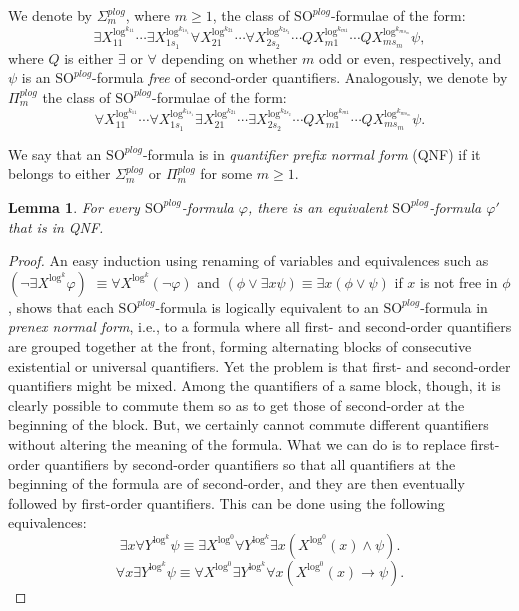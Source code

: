 \documentclass{article}
\newtheorem{lemma}{Lemma}
\begin{document}
We denote by $\Sigma^{\mathit{plog}}_m$, where $m \geq 1$, the class of $\mathrm{SO}^{\mathit{plog}}$-formulae of the form:
\[\exists X^{\log^{k_{11}}}_{11} \cdots \exists X^{\log^{k_{1s_1}}}_{1s_1} \forall X^{\log^{k_{21}}}_{21} \cdots \forall X^{\log^{k_{2s_2}}}_{2s_2} \cdots Q X^{\log^{k_{m1}}}_{m1} \cdots Q X^{\log^{k_{ms_m}}}_{ms_m} \psi,\]
where $Q$ is either $\exists$ or $\forall$ depending on whether $m$ odd or even, respectively, and $\psi$ is an $\mathrm{SO}^{\mathit{plog}}$-formula \emph{free} of second-order quantifiers.  
Analogously, we denote by $\Pi^{\mathit{plog}}_m$ the class of $\mathrm{SO}^{\mathit{plog}}$-formulae of the form:
\[\forall X^{\log^{k_{11}}}_{11} \cdots \forall X^{\log^{k_{1s_1}}}_{1s_1} \exists X^{\log^{k_{21}}}_{21} \cdots \exists X^{\log^{k_{2s_2}}}_{2s_2} \cdots Q X^{\log^{k_{m1}}}_{m1} \cdots Q X^{\log^{k_{ms_m}}}_{ms_m} \psi.\]

We say that an $\mathrm{SO}^{\mathit{plog}}$-formula is in \emph{quantifier prefix normal form} (QNF) if it belongs to either $\Sigma^{\mathit{plog}}_m$ or $\Pi^{\mathit{plog}}_m$ for some $m \geq 1$.

\begin{lemma}\label{lem-snf}
For every $\mathrm{SO}^{\mathit{plog}}$-formula $\varphi$, there is an equivalent $\mathrm{SO}^{\mathit{plog}}$-formula $\varphi'$ that is in QNF.
\end{lemma} 

\begin{proof}
An easy induction using renaming of variables and equivalences such as $(\neg \exists X^{\log^k} \varphi)$ $\equiv \forall X^{\log^k} (\neg \varphi)$ and $(\phi \vee
\exists x \psi) \equiv \exists x (\phi \vee \psi)$ if $x$ is not free in $\phi$, shows that each $\mathrm{SO}^{\mathit{plog}}$-formula is logically equivalent to an $\mathrm{SO}^{\mathit{plog}}$-formula in \emph{prenex normal form}, i.e., to a formula where all first- and second-order quantifiers are grouped together at the front, forming alternating blocks of consecutive existential or universal quantifiers. Yet the problem is that first- and second-order quantifiers might be mixed. Among the quantifiers of a same block, though, it is clearly possible to commute them 
so as to get those of second-order at the beginning of the block. But, we certainly cannot commute different quantifiers without altering the meaning of the formula. What we can do is to replace first-order quantifiers by second-order quantifiers so that all quantifiers at the beginning of the formula are of second-order, and they are then eventually followed by first-order quantifiers. This can be done using the following equivalences:
\[ \exists x \forall Y^{\log^k} \psi \equiv \exists X^{\log^0} \forall Y^{\log^k} \exists x (X^{\log^0}(x) \wedge \psi).\]
\[ \forall x \exists Y^{\log^k} \psi \equiv \forall X^{\log^0} \exists Y^{\log^k} \forall x (X^{\log^0}(x) \rightarrow \psi). \]
\end{proof}
\end{document}
